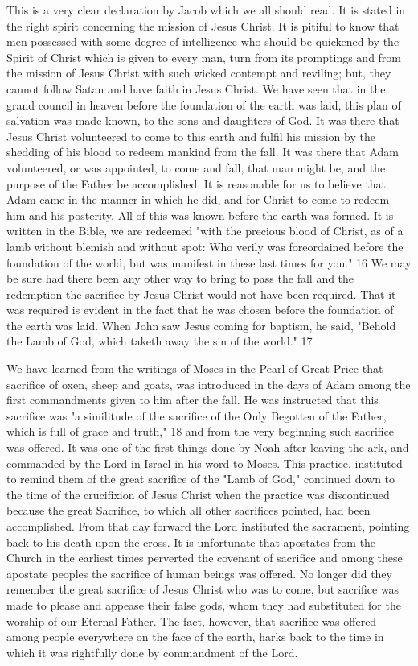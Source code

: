 This is a very clear declaration by Jacob which we all should read. It is stated in the right
spirit concerning the mission of Jesus Christ. It is pitiful to know that men possessed with
some degree of intelligence who should be quickened by the Spirit of Christ which is given
to every man, turn from its promptings and from the mission of Jesus Christ with such
wicked contempt and reviling; but, they cannot follow Satan and have faith in Jesus Christ.
We have seen that in the grand council in heaven before the foundation of the earth was laid,
this plan of salvation was made known, to the sons and daughters of God. It was there that
Jesus Christ volunteered to come to this earth and fulfil his mission by the shedding of his
blood to redeem mankind from the fall. It was there that Adam volunteered, or was
appointed, to come and fall, that man might be, and the purpose of the Father be
accomplished. It is reasonable for us to believe that Adam came in the manner in which he
did, and for Christ to come to redeem him and his posterity. All of this was known before the
earth was formed. It is written in the Bible, we are redeemed "with the precious blood of
Christ, as of a lamb without blemish and without spot: Who verily was foreordained before
the foundation of the world, but was manifest in these last times for you." 16 We may be sure
had there been any other way to bring to pass the fall and the redemption the sacrifice by
Jesus Christ would not have been required. That it was required is evident in the fact that he
was chosen before the foundation of the earth was laid. When John saw Jesus coming for
baptism, he said, "Behold the Lamb of God, which taketh away the sin of the world." 17

We have learned from the writings of Moses in the Pearl of Great Price that sacrifice of oxen,
sheep and goats, was introduced in the days of Adam among the first commandments given
to him after the fall. He was instructed that this sacrifice was "a similitude of the sacrifice of
the Only Begotten of the Father, which is full of grace and truth," 18 and from the very
beginning such sacrifice was offered. It was one of the first things done by Noah after
leaving the ark, and commanded by the Lord in Israel in his word to Moses. This practice,
instituted to remind them of the great sacrifice of the "Lamb of God," continued down to the
time of the crucifixion of Jesus Christ when the practice was discontinued because the great
Sacrifice, to which all other sacrifices pointed, had been accomplished. From that day
forward the Lord instituted the sacrament, pointing back to his death upon the cross. It is
unfortunate that apostates from the Church in the earliest times perverted the covenant of
sacrifice and among these apostate peoples the sacrifice of human beings was offered. No
longer did they remember the great sacrifice of Jesus Christ who was to come, but sacrifice
was made to please and appease their false gods, whom they had substituted for the worship
of our Eternal Father. The fact, however, that sacrifice was offered among people everywhere
on the face of the earth, harks back to the time in which it was rightfully done by
commandment of the Lord.

